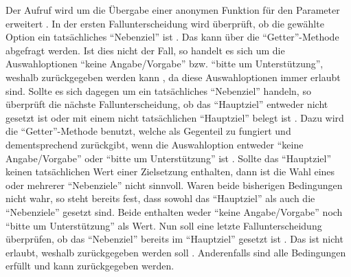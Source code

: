 Der Aufruf  wird um die Übergabe einer anonymen Funktion für den Parameter  erweitert .
In der ersten Fallunterscheidung wird überprüft,
ob die gewählte Option ein tatsächliches \enquote{Nebenziel} ist .
Das kann über die \enquote{Getter}-Methode  abgefragt werden.
Ist dies nicht der Fall,
so handelt es sich um die Auswahloptionen \enquote{keine Angabe/Vorgabe} bzw. \enquote{bitte um Unterstützung},
weshalb  zurückgegeben werden kann ,
da diese Auswahloptionen immer erlaubt sind.
Sollte es sich dagegen um ein tatsächliches \enquote{Nebenziel} handeln,
so überprüft die nächste Fallunterscheidung,
ob das \enquote{Hauptziel} entweder nicht gesetzt ist
oder mit einem nicht tatsächlichen \enquote{Hauptziel} belegt ist .
Dazu wird die \enquote{Getter}-Methode  benutzt,
welche als Gegenteil zu  fungiert
und dementsprechend  zurückgibt, wenn die Auswahloption entweder \enquote{keine Angabe/Vorgabe} oder \enquote{bitte um Unterstützung} ist .
Sollte das \enquote{Hauptziel} keinen tatsächlichen Wert einer Zielsetzung enthalten,
dann ist die Wahl eines oder mehrerer \enquote{Nebenziele} nicht sinnvoll.
Waren beide bisherigen Bedingungen nicht wahr,
so steht bereits fest,
dass sowohl das \enquote{Hauptziel}
als auch die \enquote{Nebenziele} gesetzt sind.
Beide enthalten weder \enquote{keine Angabe/Vorgabe}
noch \enquote{bitte um Unterstützung} als Wert.
Nun soll eine letzte Fallunterscheidung überprüfen,
ob das \enquote{Nebenziel} bereits im \enquote{Hauptziel} gesetzt ist .
Das ist nicht erlaubt,
weshalb  zurückgegeben werden soll .
Anderenfalls sind alle Bedingungen erfüllt und  kann zurückgegeben werden.

